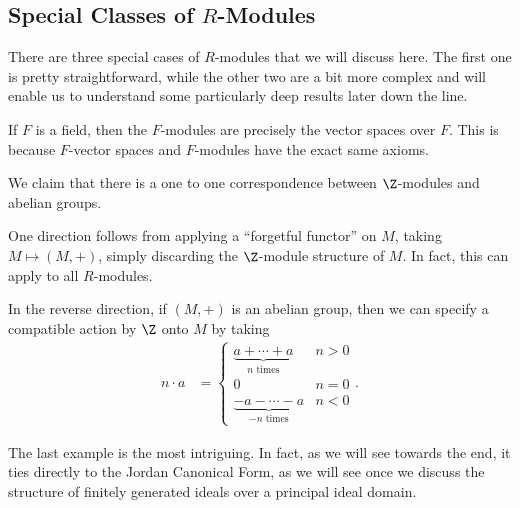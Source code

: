 \documentclass[10pt]{mypackage}
\begin{document}
\subsection{Special Classes of $R$-Modules}%
There are three special cases of $R$-modules that we will discuss here. The first one is pretty straightforward, while the other two are a bit more complex and will enable us to understand some particularly deep results later down the line.
\begin{example}
  If $F$ is a field, then the $F$-modules are precisely the vector spaces over $F$. This is because $F$-vector spaces and $F$-modules have the exact same axioms.
\end{example}
\begin{example}
  We claim that there is a one to one correspondence between $\Z$-modules and abelian groups.\newline

  One direction follows from applying a ``forgetful functor'' on $M$, taking $M\mapsto \left( M,+ \right)$, simply discarding the $\Z$-module structure of $M$. In fact, this can apply to all $R$-modules.\newline

  In the reverse direction, if $\left( M,+ \right)$ is an abelian group, then we can specify a compatible action by $\Z$ onto $M$ by taking
  \begin{align*}
    n\cdot a &= \begin{cases}
      \underbrace{a + \cdots + a}_{n\text{ times}} & n > 0\\
      0 & n = 0\\
      \underbrace{-a-\cdots-a}_{-n\text{ times}} & n < 0
    \end{cases}.
  \end{align*}
\end{example}
The last example is the most intriguing. In fact, as we will see towards the end, it ties directly to the Jordan Canonical Form, as we will see once we discuss the structure of finitely generated ideals over a principal ideal domain.
\end{document}
